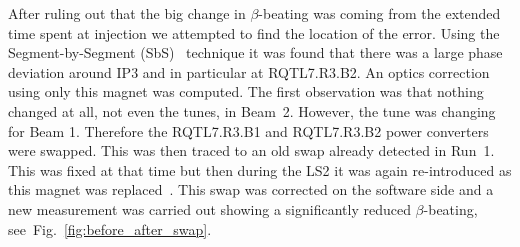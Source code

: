 \documentclass[a4paper]{cernatsnote}
\begin{document}
After ruling out that the big change in $\beta$-beating was coming from the extended time spent at injection we attempted to find the location of the error. Using the Segment-by-Segment (SbS)~\cite{first} technique it was found that there was a large phase deviation around IP3 and in particular at RQTL7.R3.B2. An optics correction using only this magnet was computed. The first observation was that nothing changed at all, not even the tunes, in Beam~2. However, the tune was changing for Beam 1. Therefore the RQTL7.R3.B1 and RQTL7.R3.B2 power converters were swapped. This was then traced to an old swap already detected in Run~1. This was fixed at that time but then during the LS2 it was again re-introduced as this magnet was replaced~\cite{first, michiEvian}. This swap was corrected on the software side and a new measurement was carried out showing a significantly reduced $\beta$-beating, see~Fig.~\ref{fig:before_after_swap}.
\end{document}
